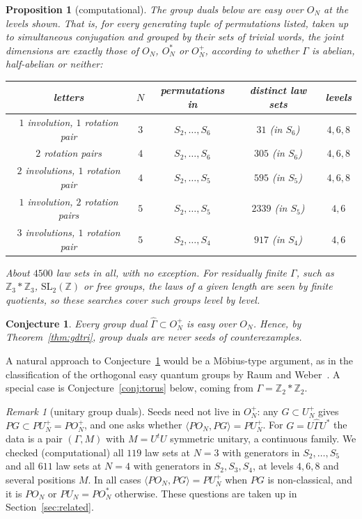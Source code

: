 \documentclass[11pt]{amsart}
\newtheorem{proposition}[theorem]{Proposition}
\newtheorem{conjecture}[theorem]{Conjecture}
\theoremstyle{definition}
\theoremstyle{remark}
\newtheorem{remark}[theorem]{Remark}
\theoremstyle{plain}
\numberwithin{equation}{section}
\numberwithin{table}{section}
\newcommand{\Z}{\mathbb Z}
\begin{document}
\begin{proposition}[computational]\label{prop:gdcomp}
The group duals below are easy over $O_N$ at the levels shown. That is, for every generating tuple of permutations listed, taken up to simultaneous conjugation and grouped by their sets of trivial words, the joint dimensions are exactly those of $O_N$, $O_N^*$ or $O_N^+$, according to whether $\Gamma$ is abelian, half-abelian or neither:
\begin{center}
\begin{tabular}{@{}ccccc@{}}
\toprule
letters & $N$ & permutations in & distinct law sets & levels \\
\midrule
$1$ involution, $1$ rotation pair & $3$ & $S_2,\dots,S_6$ & $31$ (in $S_6$) & $4,6,8$ \\
$2$ rotation pairs & $4$ & $S_2,\dots,S_6$ & $305$ (in $S_6$) & $4,6,8$ \\
$2$ involutions, $1$ rotation pair & $4$ & $S_2,\dots,S_5$ & $595$ (in $S_5$) & $4,6,8$ \\
$1$ involution, $2$ rotation pairs & $5$ & $S_2,\dots,S_5$ & $2339$ (in $S_5$) & $4,6$ \\
$3$ involutions, $1$ rotation pair & $5$ & $S_2,\dots,S_4$ & $917$ (in $S_4$) & $4,6$ \\
\bottomrule
\end{tabular}
\end{center}
About $4500$ law sets in all, with no exception. For residually finite $\Gamma$, such as $\Z_3*\Z_3$, $\mathrm{SL}_2(\Z)$ or free groups, the laws of a given length are seen by finite quotients, so these searches cover such groups level by level.
\end{proposition}

\begin{conjecture}\label{conj:easiness}
Every group dual $\widehat\Gamma\subset O_N^+$ is easy over $O_N$. Hence, by Theorem~\ref{thm:gdtri}, group duals are never seeds of counterexamples.
\end{conjecture}

A natural approach to Conjecture~\ref{conj:easiness} would be a M\"obius-type argument, as in the classification of the orthogonal easy quantum groups by Raum and Weber~\cite{rw}. A special case is Conjecture~\ref{conj:torus} below, coming from $\Gamma=\Z_2*\Z_2$.

\begin{remark}[unitary group duals]
Seeds need not live in $O_N^+$: any $G\subset U_N^+$ gives $PG\subset PU_N^+=PO_N^+$, and one asks whether
$\langle PO_N,PG\rangle=PU_N^+$. For $G=U\widehat\Gamma U^*$ the data is a pair $(\Gamma,M)$ with $M=U^tU$ symmetric
unitary, a continuous family. We checked (computational) all $119$ law sets at $N=3$ with generators in $S_2,\dots,S_5$
and all $611$ law sets at $N=4$ with generators in $S_2,S_3,S_4$, at levels $4,6,8$ and several positions $M$. In all cases
$\langle PO_N,PG\rangle=PU_N^+$ when $PG$ is non-classical, and it is $PO_N$ or $PU_N=PO_N^*$ otherwise. These questions
are taken up in Section~\ref{sec:related}.
\end{remark}
\end{document}
